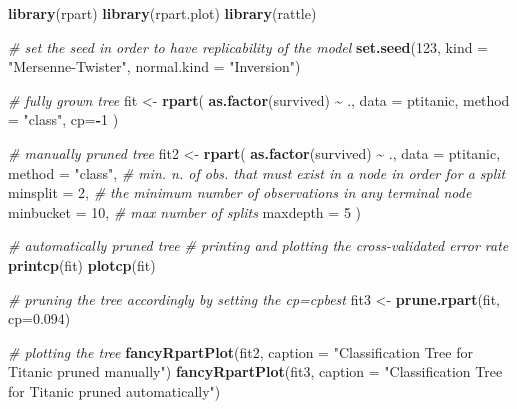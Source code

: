 \documentclass[
]{svmono}
\newenvironment{Shaded}{\begin{snugshade}}{\end{snugshade}}
\newcommand{\AttributeTok}[1]{\textcolor[rgb]{0.13,0.29,0.53}{#1}}
\newcommand{\CommentTok}[1]{\textcolor[rgb]{0.56,0.35,0.01}{\textit{#1}}}
\newcommand{\DecValTok}[1]{\textcolor[rgb]{0.00,0.00,0.81}{#1}}
\newcommand{\FloatTok}[1]{\textcolor[rgb]{0.00,0.00,0.81}{#1}}
\newcommand{\FunctionTok}[1]{\textcolor[rgb]{0.13,0.29,0.53}{\textbf{#1}}}
\newcommand{\NormalTok}[1]{#1}
\newcommand{\OtherTok}[1]{\textcolor[rgb]{0.56,0.35,0.01}{#1}}
\newcommand{\SpecialCharTok}[1]{\textcolor[rgb]{0.81,0.36,0.00}{\textbf{#1}}}
\newcommand{\StringTok}[1]{\textcolor[rgb]{0.31,0.60,0.02}{#1}}
\begin{document}
\begin{Shaded}
\begin{Highlighting}[]
\FunctionTok{library}\NormalTok{(rpart)}
\FunctionTok{library}\NormalTok{(rpart.plot)}
\FunctionTok{library}\NormalTok{(rattle)}

\CommentTok{\# set the seed in order to have replicability of the model}
\FunctionTok{set.seed}\NormalTok{(}\DecValTok{123}\NormalTok{, }\AttributeTok{kind =} \StringTok{"Mersenne{-}Twister"}\NormalTok{, }\AttributeTok{normal.kind =}  \StringTok{"Inversion"}\NormalTok{)}

\CommentTok{\# fully grown tree}
\NormalTok{fit }\OtherTok{\textless{}{-}} \FunctionTok{rpart}\NormalTok{(}
        \FunctionTok{as.factor}\NormalTok{(survived) }\SpecialCharTok{\textasciitilde{}}\NormalTok{ ., }
        \AttributeTok{data =}\NormalTok{ ptitanic, }
        \AttributeTok{method =} \StringTok{"class"}\NormalTok{,}
        \AttributeTok{cp=}\SpecialCharTok{{-}}\DecValTok{1}
\NormalTok{)}

\CommentTok{\# manually pruned tree}
\NormalTok{fit2 }\OtherTok{\textless{}{-}} \FunctionTok{rpart}\NormalTok{(}
        \FunctionTok{as.factor}\NormalTok{(survived) }\SpecialCharTok{\textasciitilde{}}\NormalTok{ ., }
        \AttributeTok{data =}\NormalTok{ ptitanic, }
        \AttributeTok{method =} \StringTok{"class"}\NormalTok{,}
        \CommentTok{\# min. n. of obs. that must exist in a node in order for a split }
        \AttributeTok{minsplit =} \DecValTok{2}\NormalTok{, }
        \CommentTok{\# the minimum number of observations in any terminal node}
        \AttributeTok{minbucket =} \DecValTok{10}\NormalTok{, }
        \CommentTok{\# max number of splits}
        \AttributeTok{maxdepth =} \DecValTok{5}
\NormalTok{)}

\CommentTok{\# automatically pruned tree}
\CommentTok{\# printing and plotting the cross{-}validated error rate}
\FunctionTok{printcp}\NormalTok{(fit)}
\FunctionTok{plotcp}\NormalTok{(fit)}

\CommentTok{\# pruning the tree accordingly by setting the cp=cpbest}
\NormalTok{fit3 }\OtherTok{\textless{}{-}} \FunctionTok{prune.rpart}\NormalTok{(fit, }\AttributeTok{cp=}\FloatTok{0.094}\NormalTok{)}

\CommentTok{\# plotting the tree}
\FunctionTok{fancyRpartPlot}\NormalTok{(fit2, }\AttributeTok{caption =} \StringTok{"Classification Tree for Titanic pruned manually"}\NormalTok{)}
\FunctionTok{fancyRpartPlot}\NormalTok{(fit3, }\AttributeTok{caption =} \StringTok{"Classification Tree for Titanic pruned automatically"}\NormalTok{)}
\end{Highlighting}
\end{Shaded}
\end{document}
